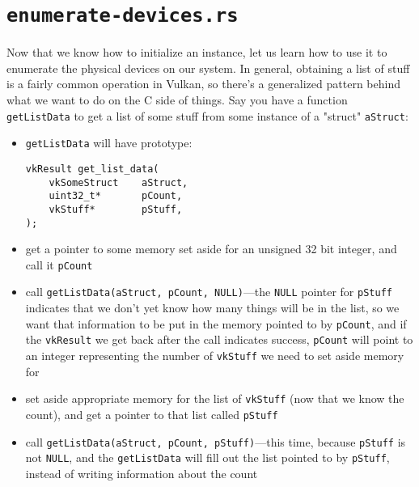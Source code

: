 \documentclass[12pt,letterpaper]{article}
\newcommand{\cil}[1]{\texttt{#1}}
\begin{document}
\section{\texttt{enumerate-devices.rs}}
	Now that we know how to initialize an instance, let us learn how to use it to enumerate the physical devices on our system. In general, obtaining a list of stuff is a fairly common operation in Vulkan, so there's a generalized pattern behind what we want to do on the C side of things. Say you have a function \cil{getListData} to get a list of some stuff from some instance of a "struct" \cil{aStruct}:
		\begin{itemize}
			\item \cil{getListData} will have prototype:
				\begin{verbatim}
vkResult get_list_data(
	vkSomeStruct 	aStruct,
	uint32_t*		pCount,
	vkStuff*		pStuff,	
);
				\end{verbatim}
			\item get a pointer to some memory set aside for an unsigned 32 bit integer, and call it \cil{pCount}
			
			\item call \cil{getListData(aStruct, pCount, NULL)}---the \cil{NULL} pointer for \cil{pStuff} indicates that we don't yet know how many things will be in the list, so we want that information to be put in the memory pointed to by \cil{pCount}, and if the \cil{vkResult} we get back after the call indicates success, \cil{pCount} will point to an integer representing the number of \cil{vkStuff} we need to set aside memory for
			
			\item set aside appropriate memory for the list of \cil{vkStuff} (now that we know the count), and get a pointer to that list called \cil{pStuff}
			
			\item call \cil{getListData(aStruct, pCount, pStuff)}---this time, because \cil{pStuff} is not \cil{NULL}, and the \cil{getListData} will fill out the list pointed to by \cil{pStuff}, instead of writing information about the count
		\end{itemize}
\end{document}
